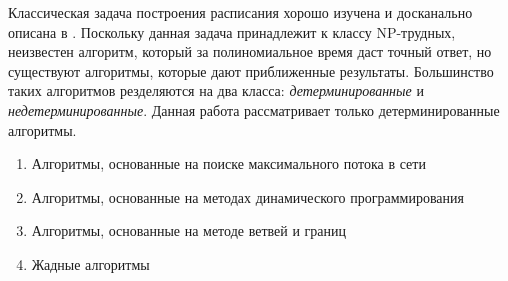 Классическая задача построения расписания хорошо изучена и досканально описана в \cite{Coffman}. Поскольку данная задача принадлежит к классу NP-трудных, неизвестен алгоритм, который за полиномиальное время даст точный ответ, но существуют алгоритмы, которые дают приближенные результаты. Большинство таких алгоритмов резделяются на два класса: \textit{детерминированные} и \textit{недетерминированные}. Данная работа рассматривает только детерминированные алгоритмы.
\begin{enumerate}
    \item Алгоритмы, основанные на поиске максимального потока в сети
    \item Алгоритмы, основанные на методах динамического программирования
    \item Алгоритмы, основанные на методе ветвей и границ
    \item Жадные алгоритмы
\end{enumerate}
